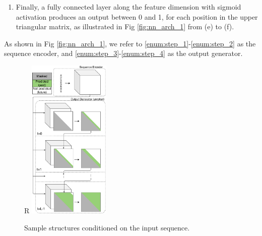 \documentclass{article}
\begin{document}
\begin{enumerate}[leftmargin=*]
    \item \label{enum:step_4} Finally, a fully connected layer along the feature dimension
   with sigmoid activation produces an output between 0 and 1,
    for each position in the upper triangular matrix, as illustrated in Fig \ref{fig:nn_arch_1} from (e) to (f).

\end{enumerate}

As shown in Fig \ref{fig:nn_arch_1}, we refer to \ref{enum:step_1}-\ref{enum:step_2} as the sequence encoder,
and \ref{enum:step_3}-\ref{enum:step_4} as the output generator.



%


\begin{figure}{R}
        \centering
        \includegraphics[width=0.35\textwidth]{plot/nn_arch_2.pdf}
        \caption{Sample structures conditioned on the input sequence.}
        \vspace{-3em}
        \label{fig:nn_arch_2}
        \centering
\end{figure}
\end{document}
